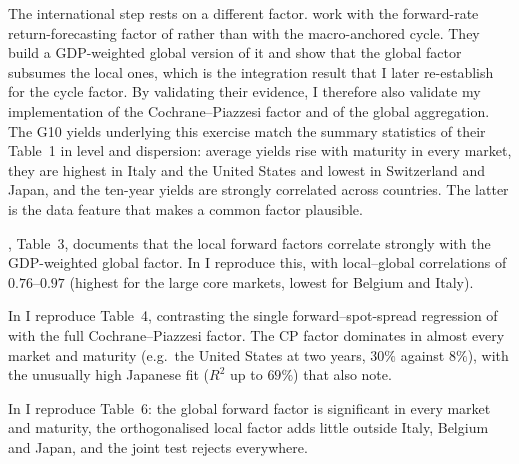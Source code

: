 The international step rests on a different factor. \citet{dahlquist2013} work
with the forward-rate return-forecasting factor of \citet{cochrane2005} rather
than with the macro-anchored cycle. They build a GDP-weighted global version of
it and show that the global factor subsumes the local ones, which is the
integration result that I later re-establish for the cycle factor. By validating
their evidence, I therefore also validate my implementation of the
Cochrane--Piazzesi factor and of the global aggregation. The G10 yields
underlying this exercise match the summary statistics of their Table~1 in level
and dispersion: average yields rise with maturity in every market, they are
highest in Italy and the United States and lowest in Switzerland and Japan, and
the ten-year yields are strongly correlated across countries. The latter is the
data feature that makes a common factor plausible.

\citet{dahlquist2013}, Table~3, documents that the local forward factors
correlate strongly with the GDP-weighted global factor. In  I
reproduce this, with local--global correlations of $0.76$--$0.97$ (highest for
the large core markets, lowest for Belgium and Italy).

\begin{table}[t]
  \caption{Correlations between local and global Cochrane--Piazzesi factors (DH Table~3)}
  \label{tab:dh-t3}
  \centering
  
\end{table}

In  I reproduce Table~4, contrasting the single forward--spot-spread
regression of \citet{famabliss1987} with the full Cochrane--Piazzesi factor. The
CP factor dominates in almost every market and maturity (e.g.\ the United States
at two years, $30\%$ against $8\%$), with the unusually high Japanese fit
($R^{2}$ up to $69\%$) that \citet{dahlquist2013} also note.

\begin{table}[t]
  \caption{Fama--Bliss and Cochrane--Piazzesi regressions by country (DH Table~4)}
  \label{tab:dh-t4}
  \centering
  
\end{table}

In  I reproduce Table~6: the global forward factor is
significant in every market and maturity, the orthogonalised local factor adds
little outside Italy, Belgium and Japan, and the joint test rejects everywhere.

\begin{table}[t]
  \caption{Local and global Cochrane--Piazzesi regressions (DH Table~6)}
  \label{tab:dh-t6}
  \centering
  
\end{table}

